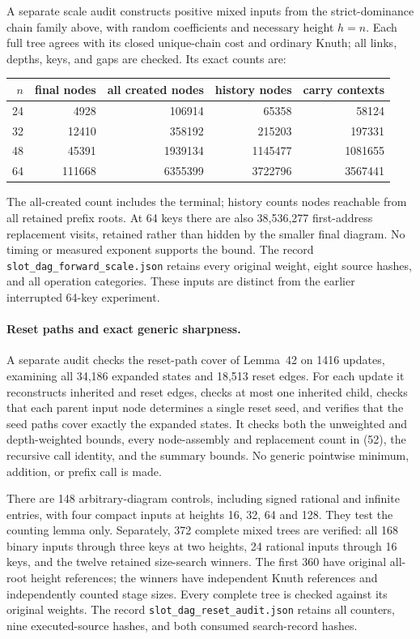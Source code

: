 \documentclass[11pt]{article}
\begin{document}
A separate scale audit constructs positive mixed inputs from the
strict-dominance chain family above, with random coefficients and necessary
height $h=n$. Each full tree agrees with its closed unique-chain cost and
ordinary Knuth; all links, depths, keys, and gaps are checked. Its exact
counts are:
\begin{center}
\begin{tabular}{r|r r r r}
$n$ & final nodes & all created nodes & history nodes & carry contexts\\
\hline
24 & 4928 & 106914 & 65358 & 58124\\
32 & 12410 & 358192 & 215203 & 197331\\
48 & 45391 & 1939134 & 1145477 & 1081655\\
64 & 111668 & 6355399 & 3722796 & 3567441
\end{tabular}
\end{center}
The all-created count includes the terminal; history counts nodes reachable
from all retained prefix roots. At 64 keys there are also 38,536,277
first-address replacement visits, retained rather than hidden by the
smaller final diagram. No timing or measured exponent supports the bound.
The record \texttt{slot\_dag\_forward\_scale.json} retains every original
weight, eight source hashes, and all operation categories. These inputs
are distinct from the earlier interrupted 64-key experiment.

\paragraph{Reset paths and exact generic sharpness.}
A separate audit checks the reset-path cover of
Lemma~42 on 1416 updates, examining all 34,186
expanded states and 18,513 reset edges. For each update it reconstructs
inherited and reset edges, checks at most one inherited child, checks that
each parent input node determines a single reset seed, and verifies that
the seed paths cover exactly the expanded states. It checks both the
unweighted and depth-weighted bounds, every node-assembly and replacement
count in (52), the recursive call identity, and the
summary bounds. No generic pointwise minimum, addition, or prefix call is
made.

There are 148 arbitrary-diagram controls, including signed rational and
infinite entries, with four compact inputs at heights 16, 32, 64 and 128.
They test the counting lemma only. Separately, 372 complete mixed trees
are verified: all 168 binary inputs through three keys at two heights,
24 rational inputs through 16 keys, and the twelve retained size-search
winners. The first 360 have original all-root height references; the
winners have independent Knuth references and independently counted stage
sizes. Every complete tree is checked against its original weights.
The record \texttt{slot\_dag\_reset\_audit.json} retains all counters, nine
executed-source hashes, and both consumed search-record hashes.
\end{document}
